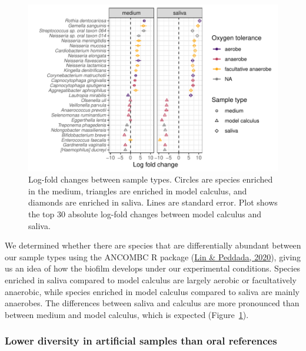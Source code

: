 \documentclass[
  b5paper,
]{book}
\begin{document}
\begin{figure}

{\centering \includegraphics{figures/byoc-valid-fig-diffabund-byoc-1.pdf}

}

\caption{\label{fig-diffabund-byoc}Log-fold changes between sample
types. Circles are species enriched in the medium, triangles are
enriched in model calculus, and diamonds are enriched in saliva. Lines
are standard error. Plot shows the top 30 absolute log-fold changes
between model calculus and saliva.}

\end{figure}

We determined whether there are species that are differentially abundant
between our sample types using the ANCOMBC R package
(\protect\hyperlink{ref-linANCOMBC2020}{Lin \& Peddada, 2020}), giving
us an idea of how the biofilm develops under our experimental
conditions. Species enriched in saliva compared to model calculus are
largely aerobic or facultatively anaerobic, while species enriched in
model calculus compared to saliva are mainly anaerobes. The differences
between saliva and calculus are more pronounced than between medium and
model calculus, which is expected (Figure~\ref{fig-diffabund-byoc}).

\hypertarget{lower-diversity-in-artificial-samples-than-oral-references}{%
\subsubsection{Lower diversity in artificial samples than oral
references}\label{lower-diversity-in-artificial-samples-than-oral-references}}
\end{document}
